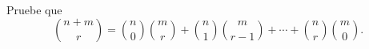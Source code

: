 \begin{statement}{1}
  Pruebe que
  \[
      \binom{n + m}{r} = \binom{n}{0}\binom{m}{r} +
      \binom{n}{1}\binom{m}{r - 1} +
      \cdots +
      \binom{n}{r}\binom{m}{0}.
  \]
\end{statement}